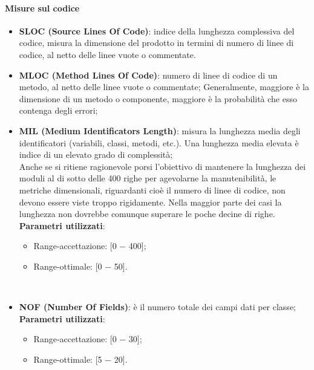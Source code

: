 	\paragraph{Misure sul codice}
	\linebreak
	\begin{itemize}

		\item \textbf{SLOC (Source Lines Of Code)}: indice della lunghezza complessiva del codice, misura la dimensione del prodotto in termini di numero di linee di codice, al netto delle linee vuote o commentate.
		
		\item \textbf{MLOC (Method Lines Of Code)}: numero di linee di codice di un metodo, al netto delle linee vuote o commentate; Generalmente, maggiore è la dimensione di un metodo o componente, maggiore è la probabilità che esso contenga degli errori;
		
		\item \textbf{MIL (Medium Identificators Length)}: misura la lunghezza media degli identificatori (variabili, classi, metodi, etc.). Una lunghezza media elevata è indice di un elevato grado di complessità;\\
	
		Anche se si ritiene ragionevole porsi l'obiettivo di mantenere la lunghezza dei moduli al di sotto delle 400 righe per agevolarne la manutenibilità, le metriche dimensionali,  riguardanti cioè il numero di linee di codice, non devono essere viste troppo rigidamente. Nella maggior parte dei casi la lunghezza non dovrebbe comunque superare le poche decine di righe. \\
		
		\textbf{Parametri utilizzati}:
		\begin{itemize}
			\item Range-accettazione: [0 − 400];
			\item Range-ottimale: [0 − 50].
		\end{itemize} \\ \bigskip
		
		 \item \textbf{NOF (Number Of Fields)}: è il numero totale dei campi dati per classe; \\
		
		\textbf{Parametri utilizzati}:
		\begin{itemize}
			\item Range-accettazione: [0 − 30];
			\item Range-ottimale: [5 − 20].
		\end{itemize} \\ \bigskip
		

\end{itemize}

